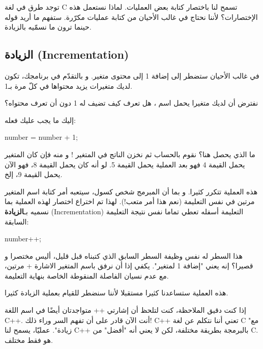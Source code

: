 توجد طرق في لغة \textenglish{C}
تسمح لنا باختصار كتابة بعض العمليات. لماذا نستعمل هذه الإختصارات؟ لأننا نحتاج في غالب الأحيان من كتابة عمليات مكرّرة. ستفهم ما أريد قوله حينما ترون ما نسمّيه بالزيادة.

\subsection{الزيادة (\textenglish{Incrementation})}

في غالب الأحيان ستضطر إلى إضافة 1 إلى محتوى متغير. و بالتقدّم في برنامجك، تكون لديك متغيرات يزيد محتواها في كلّ مرة بـ1.

نفترض أن لديك متغيرا يحمل اسم
،
هل تعرف كيف تضيف له 1 دون أن تعرف محتواه؟

إليك ما يجب عليك فعله:

\begin{Csource}
number = number + 1;
\end{Csource}

ما الذي يحصل هنا؟ نقوم بالحساب
ثم نخزن الناتج في المتغير
!
و منه فإن كان المتغير يحمل القيمة 4 فهو بعد العملية يحمل القيمة 5. لو أنه كان يحمل القيمة 8، فهو الآن يحمل القيمة 9، إلخ.

هذه العملية تتكرر كثيرا. و بما أن المبرمج شخص كسول، سيتعبه أمر كتابة اسم المتغير مرتين في نفس التعليمة (نعم هذا أمر متعب!). لهذا تم اختراع اختصار لهذه العملية بما نسميه بـ\textbf{الزيادة }
(\textenglish{Incrementation})
التعليمة أسفله تعطي تماما نفس نتيجة التعليمة السابقة:

\begin{Csource}
  number++;
\end{Csource}

هذا السطر له نفس وظيفة السطر السابق الذي كتبناه قبل قليل، أليس مختصرا و قصيرا؟ إنه يعني "إضافة 1 لمتغير". يكفي إذا أن نرفق باسم المتغير
الاشارة + مرتين، مع عدم نسيان الفاصلة المنقوطة الخاصة بنهاية التعليمة.

هذه العملية ستساعدنا كثيرا مستقبلا لأننا سنضطر للقيام بعملية الزيادة كثيرا.

\begin{information}
إذا كنت دقيق الملاحظة، كنت لتلحظ أن إشارتي
++
متواجدتان أيضًا في اسم اللغة
\textenglish{C++}.
أنت الآن قادر على أن تفهم السر وراء ذلك! \textenglish{C++}
تعني أننا نتكلم عن لغة \textenglish{C}
"مع زيادة". عمليّا، يسمح لنا \textenglish{C++}
بالبرمجة بطريقة مختلفة، لكن لا يعني أنه "أفضل" من \textenglish{C}.
هو فقط مختلف.
\end{information}

